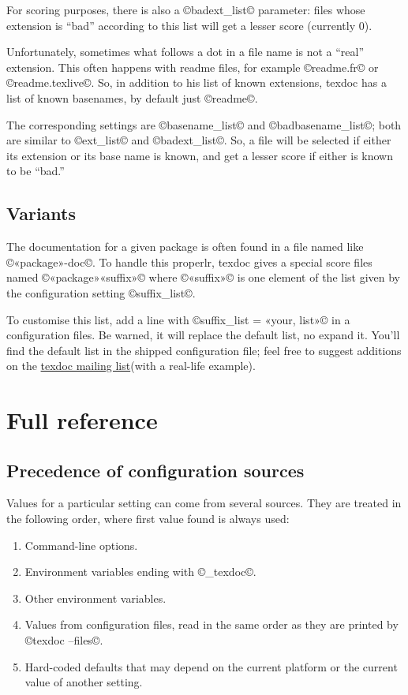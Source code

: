 \documentclass[a4paper, oneside]{scrartcl}
\makeatletter
\newcommand\tdml{\href{mailto:texdoc@tug.org}{texdoc mailing list}\xspace}
\makeatother
\begin{document}
For scoring purposes, there is also a ©badext_list© parameter: files whose
extension is ``bad'' according to this list will get a lesser score (currently
0).

Unfortunately, sometimes what follows a dot in a file name is not a ``real''
extension. This often happens with readme files, for example ©readme.fr© or
©readme.texlive©. So, in addition to his list of known extensions, texdoc has
a list of known basenames, by default just ©readme©.

The corresponding settings are ©basename_list© and ©badbasename_list©; both
are similar to ©ext_list© and ©badext_list©. So, a file will be selected if
either its extension or its base name is known, and get a lesser score if
either is known to be ``bad.''

\subsection{Variants}\label{ss-variants}

The documentation for a given package is often found in a file named like
©«package»-doc©. To handle this properlr, texdoc gives a special score files
named ©«package»«suffix»© where ©«suffix»© is one element of the list given by
the configuration setting ©suffix_list©.

To customise this list, add a line with ©suffix_list = «your, list»© in a
configuration files. Be warned, it will replace the default list, no expand
it. You'll find the default list in the shipped configuration file; feel free
to suggest additions on the \tdml (with a real-life example).

\clearpage

\section{Full reference}

\subsection{Precedence of configuration sources}\label{ss-prec}

Values for a particular setting can come from several sources. They are treated
in the following order, where first value found is always used:
\begin{enumerate}
  \item Command-line options.
  \item Environment variables ending with ©_texdoc©.
  \item Other environment variables.
  \item Values from configuration files, read in the same order as they are
    printed by ©texdoc --files©.
  \item Hard-coded defaults that may depend on the current platform or the
    current value of another setting.
\end{enumerate}
\end{document}
